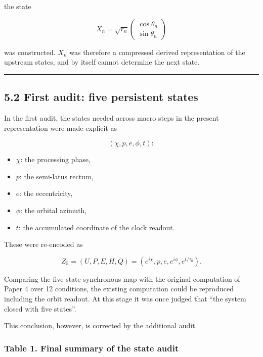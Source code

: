 \documentclass[
  a4paper,
]{article}
\providecommand{\tightlist}{%
  \setlength{\itemsep}{0pt}\setlength{\parskip}{0pt}}
\begin{document}
the state

\[
X_n
=
\sqrt{r_n}
\begin{pmatrix}
\cos\theta_n\\
\sin\theta_n
\end{pmatrix}
\]

was constructed. \(X_n\) was therefore a compressed derived
representation of the upstream states, and by itself cannot determine
the next state.

\begin{center}\rule{0.5\linewidth}{0.5pt}\end{center}

\subsection{5.2 First audit: five persistent
states}\label{first-audit-five-persistent-states}

In the first audit, the states needed across macro steps in the present
representation were made explicit as

\[
(\chi,p,e,\phi,t):
\]

\begin{itemize}
\tightlist
\item
  \(\chi\): the processing phase,
\item
  \(p\): the semi-latus rectum,
\item
  \(e\): the eccentricity,
\item
  \(\phi\): the orbital azimuth,
\item
  \(t\): the accumulated coordinate of the clock readout.
\end{itemize}

These were re-encoded as

\[
Z_5=(U,P,E,H,Q)
=(e^{i\chi},p,e,e^{i\phi},e^{t/\tau_0}).
\]

Comparing the five-state synchronous map with the original computation
of Paper 4 over 12 conditions, the existing computation could be
reproduced including the orbit readout. At this stage it was once judged
that ``the system closed with five states''.

This conclusion, however, is corrected by the additional audit.

\subsubsection{Table 1. Final summary of the state
audit}\label{table-1.-final-summary-of-the-state-audit}
\end{document}
